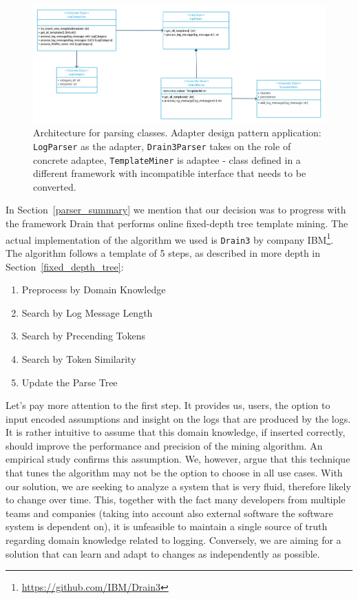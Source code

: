 \begin{figure}[!tbp]
    \includegraphics[width=\textwidth]{img/UML Adapter LogParser.png}		    
    \caption{Architecture for parsing classes. Adapter design pattern application: \texttt{LogParser} as the adapter, \texttt{Drain3Parser} takes on the role of concrete adaptee, \texttt{TemplateMiner} is adaptee - class defined in a different framework with incompatible interface that needs to be converted.}
	\label{fig:uml_parsers}
\end{figure}

In Section~\ref{parser_summary} we mention that our decision was to progress with the framework Drain \cite{drain2017} that performs online fixed-depth tree template mining. The actual implementation of the algorithm we used is \texttt{Drain3} by company IBM\footnote{\url{https://github.com/IBM/Drain3}}. The algorithm follows a template of 5 steps, as described in more depth in Section~\ref{fixed_depth_tree}:
\begin{enumerate}
    \item Preprocess by Domain Knowledge
    \item Search by Log Message Length
    \item Search by Precending Tokens
    \item Search by Token Similarity
    \item Update the Parse Tree
\end{enumerate}

Let's pay more attention to the first step. It provides us, users, the option to input encoded assumptions and insight on the logs that are produced by the logs.
It is rather intuitive to assume that this domain knowledge, if inserted correctly, should improve the performance and precision of the mining algorithm. An empirical study \cite{he2016} confirms this assumption.
We, however, argue that this technique that tunes the algorithm may not be the option to choose in all use cases. With our solution, we are seeking to analyze a system that is very fluid, therefore likely to change over time. This, together with the fact many developers from multiple teams and companies (taking into account also external software the software system is dependent on), it is unfeasible to maintain a single source of truth regarding domain knowledge related to logging. Conversely, we are aiming for a solution that can learn and adapt to changes as independently as possible.\\


